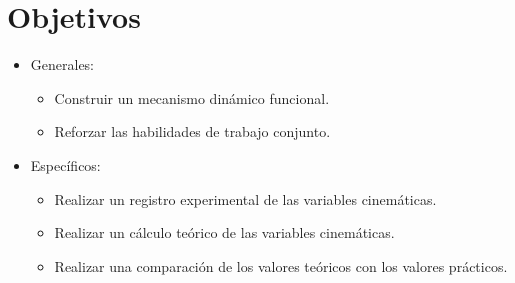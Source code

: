 \section{Objetivos}
\begin{itemize}
	\item Generales:
	\begin{itemize}
		\item Construir un mecanismo dinámico funcional.
		\item Reforzar las habilidades de trabajo conjunto.
	\end{itemize}
	\item Específicos:
	\begin{itemize}
		\item Realizar un registro experimental de las variables cinemáticas.
		\item Realizar un cálculo teórico de las variables cinemáticas.
		\item Realizar una comparación de los valores teóricos con los valores prácticos.
	\end{itemize}
\end{itemize}